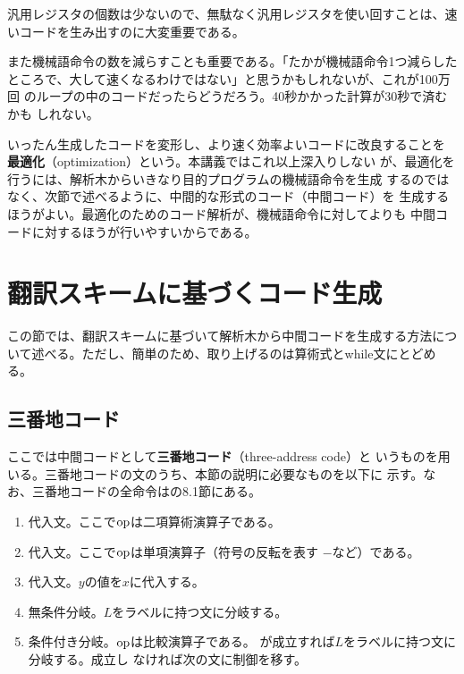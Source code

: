 汎用レジスタの個数は少ないので、無駄なく汎用レジスタを使い回すことは、速
いコードを生み出すのに大変重要である。

また機械語命令の数を減らすことも重要である。「たかが機械語命令1つ減らした
ところで、大して速くなるわけではない」と思うかもしれないが、これが100万回
のループの中のコードだったらどうだろう。40秒かかった計算が30秒で済むかも
しれない。

いったん生成したコードを変形し、より速く効率よいコードに改良することを
{\bfseries 最適化}（optimization）という。本講義ではこれ以上深入りしない
が、最適化を行うには、解析木からいきなり目的プログラムの機械語命令を生成
するのではなく、次節で述べるように、中間的な形式のコード（中間コード）を
生成するほうがよい。最適化のためのコード解析が、機械語命令に対してよりも
中間コードに対するほうが行いやすいからである。

\section{翻訳スキームに基づくコード生成}

この節では、翻訳スキームに基づいて解析木から中間コードを生成する方法につ
いて述べる。ただし、簡単のため、取り上げるのは算術式とwhile文にとどめる。

\subsection{三番地コード}

ここでは中間コードとして{\bfseries 三番地コード}（three-address code）と
いうものを用いる。三番地コードの文のうち、本節の説明に必要なものを以下に
示す。なお、三番地コードの全命令は\cite{aho86:_compiler}の8.1節にある。

\begin{enumerate}
 \item 代入文。ここで$\operatorname{op}$は二項算術演算子である。
 \item 代入文。ここで$\operatorname{op}$は単項演算子（符号の反転を表す
       $-$など）である。
 \item 代入文。$y$の値を$x$に代入する。
 \item 無条件分岐。$L$をラベルに持つ文に分岐する。
 \item 条件付き分岐。$\operatorname{op}$は比較演算子である。
       が成立すれば$L$をラベルに持つ文に分岐する。成立し
       なければ次の文に制御を移す。
\end{enumerate}


